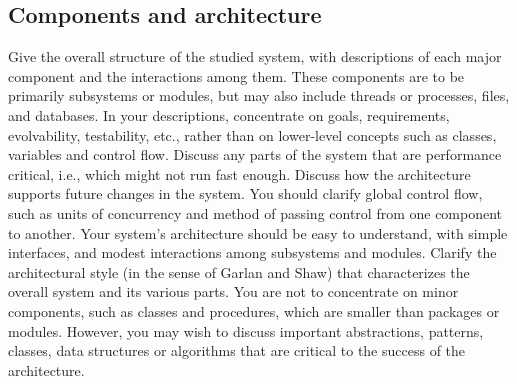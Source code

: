 \documentclass[12pt]{article}
\begin{document}
\subsection{Components and architecture}

Give the overall structure of the studied system, with descriptions of each major component and the interactions among them. These components are to be primarily subsystems or modules, but may also include threads or processes, files, and databases. In your descriptions, concentrate on goals, requirements, evolvability, testability, etc., rather than on lower-level concepts such as classes, variables and control flow. Discuss any parts of the system that are performance critical, i.e., which might not run fast enough. Discuss how the architecture supports future changes in the system. You should clarify global control flow, such as units of concurrency and method of passing control from one component to another. Your system's architecture should be easy to understand, with simple interfaces, and modest interactions among subsystems and modules. Clarify the architectural style (in the sense of Garlan and Shaw) that characterizes the overall system and its various parts. You are not to concentrate on minor components, such as classes and procedures, which are smaller than packages or modules. However, you may wish to discuss important abstractions, patterns, classes, data structures or algorithms that are critical to the success of the architecture.
\end{document}
